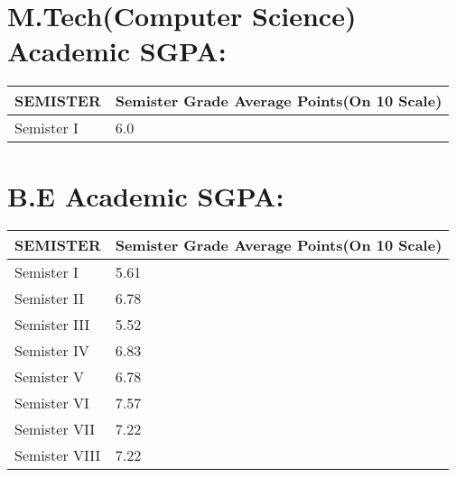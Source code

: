\documentclass[a4paper,10pt]{article}
\begin{document}
\vspace{5mm}


\section{M.Tech(Computer Science) Academic SGPA:}

\begin{tabu} to 0.8\textwidth { | X[l] | X[l] |  }
 \hline
 
 \Large
 SEMISTER  & \Large
  Semister Grade Average Points(On 10 Scale)   \\
\hline
\large Semister I & 6.0   \\
 \hline
 

\end{tabu}











\vspace{5mm}


\section{B.E Academic SGPA:}

\begin{tabu} to 0.8\textwidth { | X[l] | X[l] |  }
 \hline
 
 \Large
 SEMISTER  & \Large
  Semister Grade Average Points(On 10 Scale)   \\
\hline
\large Semister I & 5.61   \\
 \hline
 
\large Semister II & 6.78  \\
 \hline
 
 \large Semister III  &  5.52 \\
 \hline
 
\large  Semister IV & 6.83  \\
 \hline
 
\large Semister  V &   6.78 \\
 \hline
 
\large Semister VI &   7.57\\
 \hline
 
\large Semister VII  & 7.22  \\
 \hline
 
 \large Semister VIII & 7.22  \\
 \hline

\end{tabu}
\end{document}
